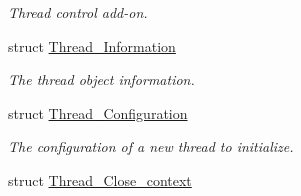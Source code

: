 \begin{DoxyCompactItemize}
\begin{DoxyCompactList}\small\item\em Thread control add-\/on. \end{DoxyCompactList}\item 
struct \mbox{\hyperlink{structThread__Information}{Thread\+\_\+\+Information}}
\begin{DoxyCompactList}\small\item\em The thread object information. \end{DoxyCompactList}\item 
struct \mbox{\hyperlink{structThread__Configuration}{Thread\+\_\+\+Configuration}}
\begin{DoxyCompactList}\small\item\em The configuration of a new thread to initialize. \end{DoxyCompactList}\item 
struct \mbox{\hyperlink{structThread__Close__context}{Thread\+\_\+\+Close\+\_\+context}}
\end{DoxyCompactItemize}
